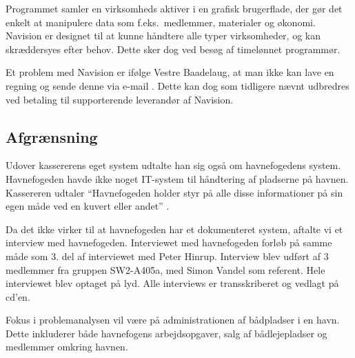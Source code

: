 Programmet samler en virksomheds aktiver i en grafisk brugerflade, der gør det enkelt at manipulere data som f.eks.\ medlemmer, materialer og økonomi. Navision er designet til at kunne håndtere alle typer virksomheder, og kan skræddersyes efter behov. Dette sker dog ved besøg af timelønnet programmør.



Et problem med Navision er ifølge Vestre Baadelaug, at man ikke kan lave en regning og sende denne via e-mail \cite{int_vb_sl}. Dette kan dog som tidligere nævnt udbredres ved betaling til supporterende leverandør af Navision.

\subsection{Afgrænsning} %
Udover kassererens eget system udtalte han sig også om havnefogedens system. Havnefogeden havde ikke noget IT-system til håndtering af pladserne på havnen. Kassereren udtaler \enquote{Havnefogeden holder styr på alle disse informationer på sin egen måde ved en kuvert eller andet} \cite{int_vb_sl}. 

Da det ikke virker til at havnefogeden har et dokumenteret system, aftalte vi et interview med havnefogeden. Interviewet med havnefogeden forløb på samme måde som 3. del af interviewet med Peter Hinrup. Interview blev udført af 3 medlemmer fra gruppen SW2-A405a, med Simon Vandel som referent. Hele interviewet blev optaget på lyd. Alle interviews er transskriberet og vedlagt på cd'en. 

Fokus i problemanalysen vil være på administrationen af bådpladser i en havn. Dette inkluderer både havnefogens arbejdsopgaver, salg af bådlejepladser og medlemmer omkring havnen.
